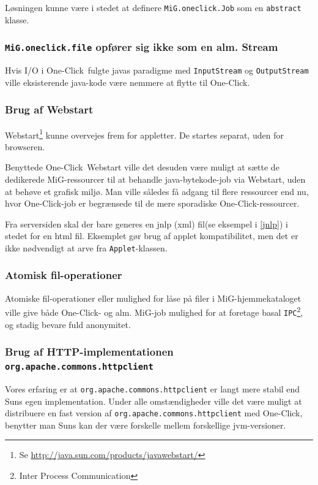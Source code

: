 \documentclass[final,a4paper,11pt]{article}
\newcommand{\mig}{MiG}
\newcommand{\oc}{One-Click}
\begin{document}
Løsningen kunne være i stedet at definere \texttt{MiG.oneclick.Job} som en \texttt{abstract} klasse. 

\subsubsection*{\texttt{MiG.oneclick.file} opfører sig ikke som en alm. Stream} 
Hvis I/O i \oc\ fulgte javas paradigme med \texttt{InputStream} og \texttt{OutputStream} ville eksisterende java-kode være nemmere at flytte til \oc.

\subsubsection*{Brug af Webstart}
Webstart\footnote{Se \url{http://java.sun.com/products/javawebstart/}} kunne overvejes frem for appletter. De startes separat, uden for browseren. 

Benyttede \oc\ Webstart ville det desuden være muligt at sætte de dedikerede \mig-ressourcer til at behandle java-bytekode-job via Webstart, uden at behøve et grafisk miljø. Man ville således få adgang til flere ressourcer end nu, hvor \oc-job er begrænsede til de mere sporadiske \oc-ressourcer.   

Fra serversiden skal der bare generes en jnlp (xml) fil(se eksempel i \ref{jnlp}) i stedet for en html fil. Eksemplet gør brug af applet kompatibilitet, men det er ikke nødvendigt at arve fra \texttt{Applet}-klassen.

\subsubsection*{Atomisk fil-operationer}
Atomiske fil-operationer eller mulighed for låse på filer i \mig-hjemmekataloget ville give både \oc- og alm. \mig-job mulighed for at foretage basal \texttt{IPC}\footnote{Inter Process Communication}, og stadig bevare fuld anonymitet. 

\subsubsection*{Brug af HTTP-implementationen \texttt{org.apache.commons.httpclient}}
Vores erfaring er at \texttt{org.apache.commons.httpclient} er langt mere stabil end Suns egen implementation. Under alle omstændigheder ville det være muligt at distribuere en fast version af \texttt{org.apache.commons.httpclient} med \oc, benytter man Suns kan der være forskelle mellem forskellige jvm-versioner.
\end{document}
